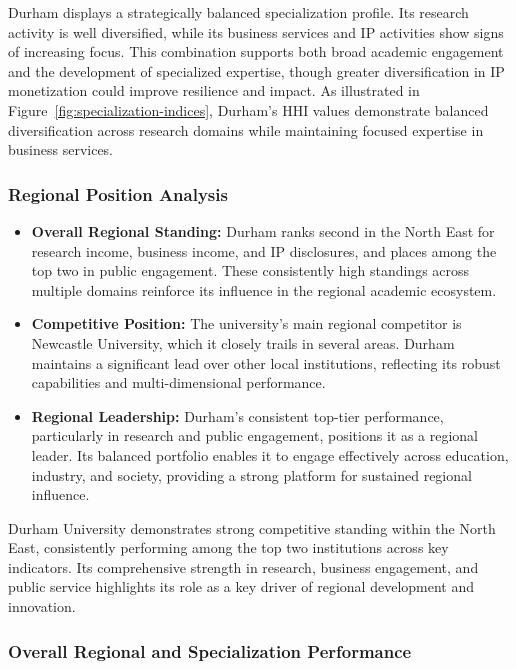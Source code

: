 \documentclass[journal,onecolumn, 10pt,draftclsnofoot]{IEEEtran}
\begin{document}
Durham displays a strategically balanced specialization profile. Its research activity is well diversified, while its business services and IP activities show signs of increasing focus. This combination supports both broad academic engagement and the development of specialized expertise, though greater diversification in IP monetization could improve resilience and impact. As illustrated in Figure~\ref{fig:specialization-indices}, Durham's HHI values demonstrate balanced diversification across research domains while maintaining focused expertise in business services.

\subsubsection{Regional Position Analysis}

\begin{itemize}
    \item \textbf{Overall Regional Standing:} Durham ranks second in the North East for research income, business income, and IP disclosures, and places among the top two in public engagement. These consistently high standings across multiple domains reinforce its influence in the regional academic ecosystem.
    
    \item \textbf{Competitive Position:} The university's main regional competitor is Newcastle University, which it closely trails in several areas. Durham maintains a significant lead over other local institutions, reflecting its robust capabilities and multi-dimensional performance.
    
    \item \textbf{Regional Leadership:} Durham's consistent top-tier performance, particularly in research and public engagement, positions it as a regional leader. Its balanced portfolio enables it to engage effectively across education, industry, and society, providing a strong platform for sustained regional influence.
\end{itemize}

Durham University demonstrates strong competitive standing within the North East, consistently performing among the top two institutions across key indicators. Its comprehensive strength in research, business engagement, and public service highlights its role as a key driver of regional development and innovation.

\subsubsection{Overall Regional and Specialization Performance}
\end{document}
